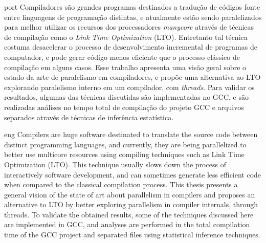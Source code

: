 \begin{resumo}{port}
    Compiladores são grandes programas destinados a tradução de códigos fonte
    entre linguagens de programação distintas, e atualmente estão sendo
    paralelizados para melhor utilizar os recursos dos processadores
    \textit{manycore} através de técnicas de compilação como o \textit{Link
    Time Optimization} (LTO).  Entretanto tal técnica costuma desacelerar o
    processo de desenvolvimento incremental de programas de computador, e pode
    gerar código menos eficiente que o processo clássico de compilação em
    alguns casos. Esse trabalho apresenta uma visão geral sobre o estado da
    arte de paralelismo em compiladores, e propõe uma alternativa ao LTO explorando
    paralelismo interno em um compilador, com \textit{threads}. Para validar
    os resultados, algumas das técnicas discutidas são implementadas no GCC, e
    são realizadas análises no tempo total de compilação do projeto GCC e
    arquivos separados através de técnicas de inferência estatística.
\end{resumo}

\begin{resumo}{eng}
Compilers are huge software destinated to translate the source code between
distinct programming languages, and currently, they are being parallelized to
better use multicore resources using compiling techniques such as Link Time
Optimization (LTO). This technique usually slows down the process of
interactively software development, and can sometimes generate less efficient
code when compared to the classical compilation process. This thesis presents a
general vision of the state of art about parallelism in compilers and proposes
an alternative to LTO by better exploring parallelism in compiler internals,
through threads. To
validate the obtained results, some of the techniques discussed here are
implemented in GCC, and analyses are performed in the total compilation time of
the GCC project and separated files using statistical inference techniques.
\end{resumo}
